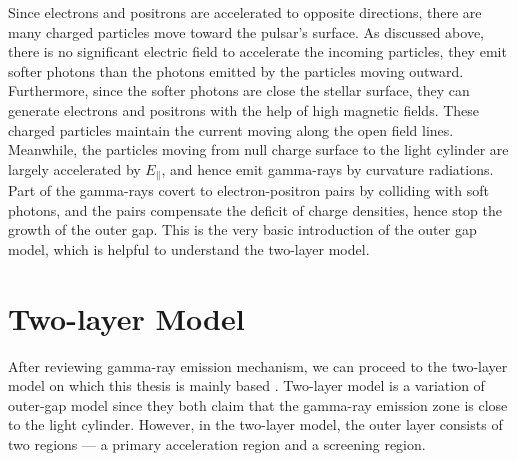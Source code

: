 \documentclass[12pt]{report}
\begin{document}
        Since electrons and positrons are accelerated to opposite directions, there are many 
        charged particles move toward the pulsar's surface. As discussed above, there is no 
        significant electric field to accelerate the incoming particles, they emit softer 
        photons than the photons emitted by the particles moving outward. Furthermore, since the 
        softer photons are close the stellar surface, they can generate electrons and 
        positrons with the help of high magnetic fields. These charged particles maintain the current 
        moving along the open field lines. Meanwhile, the particles moving from null charge 
        surface to the light cylinder are largely accelerated by $E_{\parallel}$, and hence 
        emit gamma-rays by curvature radiations. Part of the gamma-rays covert to
        electron-positron pairs by colliding with soft photons, and the pairs compensate 
        the deficit of charge densities, hence stop the growth of the outer gap. This is the 
        very basic introduction of the outer gap model, which is helpful to understand the 
        two-layer model. 
        



      \section{Two-layer Model}
        After reviewing gamma-ray emission mechanism, we can proceed to
        the two-layer model on which this thesis is mainly based \cite{0004-637X-720-1-178}. 
        Two-layer model is a variation of outer-gap model since they both claim that the 
        gamma-ray emission zone is close to the light cylinder. However, in the two-layer 
        model, the outer layer consists of two regions --- a primary acceleration region and 
        a screening region. 
\end{document}
